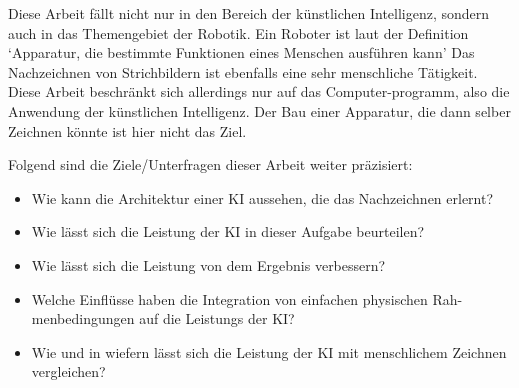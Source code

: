 Diese Arbeit fällt nicht nur in den Bereich der künstlichen Intelligenz, sondern
auch in das Themengebiet der Robotik. Ein Roboter ist laut der Definition
`Apparatur, die bestimmte Funktionen eines Menschen ausführen kann'
\cite{noauthor_duden_nodate-1} Das Nachzeichnen von Strichbildern ist ebenfalls
eine sehr menschliche Tätigkeit. Diese Arbeit beschränkt sich allerdings nur auf
das Computer\hyp{}programm, also die Anwendung der künstlichen Intelligenz. Der Bau
einer Apparatur, die dann selber Zeichnen könnte ist hier nicht das Ziel.

Folgend sind die Ziele/Unterfragen dieser Arbeit weiter präzisiert:
\begin{itemize}
    \item Wie kann die Architektur einer KI aussehen, die das Nachzeichnen
    erlernt?
    \item Wie lässt sich die Leistung der KI in dieser Aufgabe beurteilen?
    \item Wie lässt sich die Leistung von dem Ergebnis verbessern?
    \item Welche Einflüsse haben die Integration von einfachen physischen
    Rah\hyp{}menbedingungen auf die Leistungs der KI?
    \item Wie und in wiefern lässt sich die Leistung der KI mit menschlichem
    Zeichnen vergleichen?
\end{itemize}
